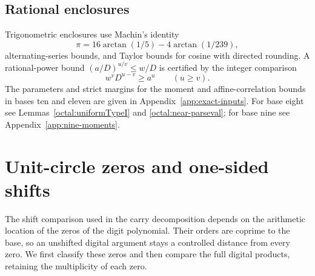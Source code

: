 \documentclass[11pt,a4paper]{article}
\theoremstyle{paperplain}
\numberwithin{equation}{section}
\begin{document}
\subsection{Rational enclosures}

Trigonometric enclosures use Machin's identity
\[
 \pi=16\arctan(1/5)-4\arctan(1/239),
\]
alternating-series bounds, and Taylor bounds for cosine with directed
rounding. A rational-power bound $(a/D)^{u/v}\leqslant w/D$ is certified
by the integer comparison
\begin{equation}\label{prelim:integer-power}
 w^vD^{u-v}\geqslant a^u\qquad(u\geqslant v).
\end{equation}
The parameters and strict margins for the moment and affine-correlation
bounds in bases ten and eleven are given in Appendix~\ref{app:exact-inputs}.
For base eight see Lemmas~\ref{octal:uniformTypeI} and
\ref{octal:near-parseval}; for base nine see Appendix~\ref{app:nine-moments}.


\section{Unit-circle zeros and one-sided shifts}\label{app:shifts}

The shift comparison used in the carry decomposition depends on the
arithmetic location of the zeros of the digit polynomial. Their orders
are coprime to the base, so an unshifted digital argument stays a controlled
distance from every zero. We first classify these zeros and then compare
the full digital products, retaining the multiplicity of each zero.
\end{document}
